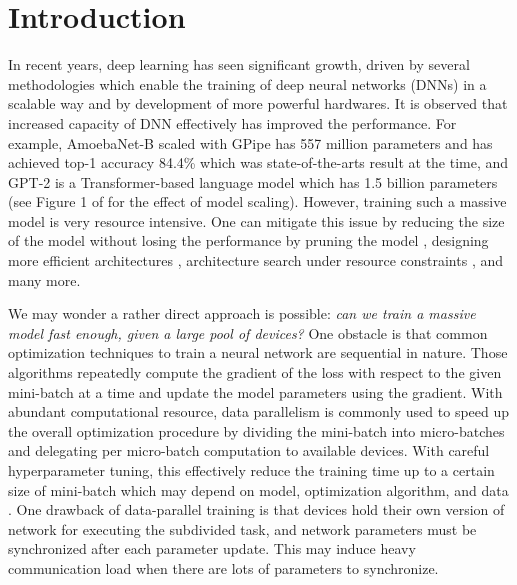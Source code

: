 
\section{Introduction}
\label{sec:introduction}

In recent years, deep learning has seen significant growth, driven by several methodologies which enable the training of deep neural networks (DNNs) in a scalable way and by development of more powerful hardwares. It is observed that increased capacity of DNN effectively has improved the performance. For example, AmoebaNet-B \cite{real2019regularized} scaled with GPipe \cite{huang2019gpipe} has 557 million parameters and has achieved top-1 accuracy 84.4\% which was state-of-the-arts result at the time, and GPT-2 \cite{radford2019language} is a Transformer-based \cite{vaswani2017attention} language model which has 1.5 billion parameters (see Figure 1 of \cite{huang2019gpipe} for the effect of model scaling). However, training such a massive model is very resource intensive. One can mitigate this issue by reducing the size of the model without losing the performance by pruning the model \cite{han2015learning, alvarez2016learning}, designing more efficient architectures \cite{howard2017mobilenets, tan2019efficientnet}, architecture search under resource constraints \cite{cai2018proxylessnas}, and many more. 

We may wonder a rather direct approach is possible: \emph{can we train a massive model fast enough, given a large pool of devices?} One obstacle is that common optimization techniques to train a neural network are sequential in nature. Those algorithms repeatedly compute the gradient of the loss with respect to the given mini-batch at a time and update the model parameters using the gradient. With abundant computational resource, data parallelism \cite{krizhevsky2012imagenet} is commonly used to speed up the overall optimization procedure by dividing the mini-batch into micro-batches and delegating per micro-batch computation to available devices. With careful hyperparameter tuning, this effectively reduce the training time up to a certain size of mini-batch which may depend on model, optimization algorithm, and data \cite{goyal2017accurate, shallue2018measuring}. One drawback of data-parallel training is that devices hold their own version of network for executing the subdivided task, and network parameters must be synchronized after each parameter update. This may induce heavy communication load when there are lots of parameters to synchronize.

